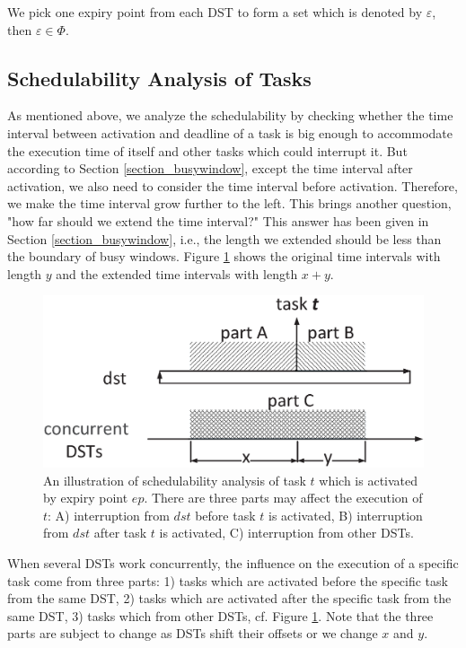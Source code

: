 \documentclass[sigconf]{acmart}
\begin{document}
We pick one expiry point from each DST to form a set which is denoted by $\varepsilon$, then $\varepsilon\in\Phi$.
\subsection{Schedulability Analysis of Tasks}
As mentioned above, we analyze the schedulability by checking whether the time interval between activation and deadline of a task is big enough to accommodate the execution time of itself and other tasks which could interrupt it. But according to Section \ref{section_busywindow}, except the time interval after activation, we also need to consider the time interval before activation. Therefore, we make the time interval grow further to the left. This brings another question, "how far should we extend the time interval?" This answer has been given in Section \ref{section_busywindow}, i.e., the length we extended should be less than the boundary of busy windows. Figure \ref{figure_3parts} shows the original time intervals with length $y$ and the extended time intervals with length $x+y$.
\begin{figure}
  \centering
  \includegraphics[scale=0.3]{graphics/figure_3parts.eps}
  \caption{An illustration of schedulability analysis of task $t$ which is activated by expiry point $ep$. There are three parts may affect the execution of $t$: A) interruption from $dst$ before task $t$ is activated, B) interruption from $dst$ after task $t$ is activated, C) interruption from other DSTs.}
  \label{figure_3parts}
\end{figure}

When several DSTs work concurrently, the influence on the execution of a specific task come from three parts: 1) tasks which are activated before the specific task from the same DST, 2) tasks which are activated after the specific task from the same DST, 3) tasks which from other DSTs, cf. Figure \ref{figure_3parts}. Note that the three parts are subject to change as DSTs shift their offsets or we change $x$ and $y$.
\end{document}
